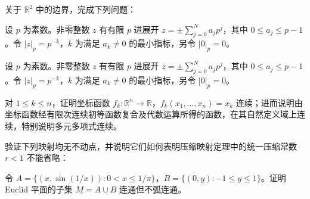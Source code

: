 \noindent\begin{minipage}{\textwidth}
关于 $\mathbb R^2$ 中的边界，完成下列问题：
\end{minipage}\par\vfill
\newpage
\noindent\begin{minipage}{\textwidth}
设 $p$ 为素数。非零整数 $z$ 有有限 $p$ 进展开 $z=\pm\sum_{j=0}^Na_jp^j$，其中 $0\le a_j\le p-1$。令 $|z|_p=p^{-k}$，$k$ 为满足 $a_k\ne0$ 的最小指标，另令 $|0|_p=0$。
\end{minipage}\par\vfill
\noindent\begin{minipage}{\textwidth}
设 $p$ 为素数。非零整数 $z$ 有有限 $p$ 进展开 $z=\pm\sum_{j=0}^Na_jp^j$，其中 $0\le a_j\le p-1$。令 $|z|_p=p^{-k}$，$k$ 为满足 $a_k\ne0$ 的最小指标，另令 $|0|_p=0$。
\end{minipage}\par\vfill
\noindent\begin{minipage}{\textwidth}
对 $1\le k\le n$，证明坐标函数 $f_k:\mathbb R^n\to\mathbb R$，$f_k(x_1,\ldots,x_n)=x_k$ 连续；进而说明由坐标函数经有限次连续初等函数复合及代数运算所得的函数，在其自然定义域上连续，特别说明多元多项式连续。
\end{minipage}\par\vfill
\noindent\begin{minipage}{\textwidth}
验证下列映射均无不动点，并说明它们如何表明压缩映射定理中的统一压缩常数 $r<1$ 不能省略：
\SubQ{2}{$f:[0,\infty)\to[0,\infty)$，$f(x)=x+\frac1{1+x}$；验证 $x\ne y$ 时 $|f(x)-f(y)|<|x-y|$。}
\end{minipage}\par\vfill
\newpage
\noindent\begin{minipage}{\textwidth}
令 $A=\{(x,\sin(1/x)):0<x\le1/\pi\}$，$B=\{(0,y):-1\le y\le1\}$。证明 Euclid 平面的子集 $M=A\cup B$ 连通但不弧连通。
\end{minipage}\par\vfill
